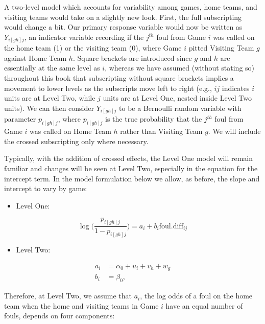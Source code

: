 \documentclass[
]{krantz}
\providecommand{\tightlist}{%
  \setlength{\itemsep}{0pt}\setlength{\parskip}{0pt}}
\begin{document}
A two-level model which accounts for variability among games, home teams, and visiting teams would take on a slightly new look. First, the full subscripting would change a bit. Our primary response variable would now be written as \(Y_{i[gh]j}\), an indicator variable recording if the \(j^{th}\) foul from Game \(i\) was called on the home team (1) or the visiting team (0), where Game \(i\) pitted Visiting Team \(g\) against Home Team \(h\). Square brackets are introduced since \(g\) and \(h\) are essentially at the same level as \(i\), whereas we have assumed (without stating so) throughout this book that subscripting without square brackets implies a movement to lower levels as the subscripts move left to right (e.g., \(ij\) indicates \(i\) units are at Level Two, while \(j\) units are at Level One, nested inside Level Two units). We can then consider \(Y_{i[gh]j}\) to be a Bernoulli random variable with parameter \(p_{i[gh]j}\), where \(p_{i[gh]j}\) is the true probability that the \(j^{th}\) foul from Game \(i\) was called on Home Team \(h\) rather than Visiting Team \(g\). We will include the crossed subscripting only where necessary.

Typically, with the addition of crossed effects, the Level One model will remain familiar and changes will be seen at Level Two, especially in the equation for the intercept term. In the model formulation below we allow, as before, the slope and intercept to vary by game:

\begin{itemize}
\tightlist
\item
  Level One:
\end{itemize}

\begin{equation}
\log\bigg(\frac{p_{i[gh]j}}{1-p_{i[gh]j}}\bigg)=a_{i}+b_{i}\mathrm{foul.diff}_{ij}
\label{eq:lev1cross} 
\end{equation}

\begin{itemize}
\tightlist
\item
  Level Two:
\end{itemize}

\begin{align*}
a_{i} & = \alpha_{0}+u_{i}+v_{h}+w_{g} \\
b_{i} & = \beta_{0},
\end{align*}

Therefore, at Level Two, we assume that \(a_{i}\), the log odds of a foul on the home team when the home and visiting teams in Game \(i\) have an equal number of fouls, depends on four components:
\end{document}
